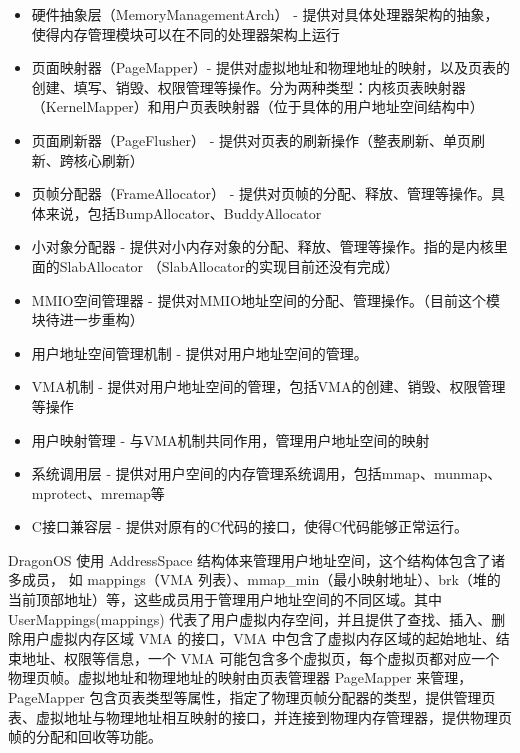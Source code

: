 \begin{itemize}
\item 硬件抽象层（MemoryManagementArch） - 提供对具体处理器架构的抽象，使得内存管理模块可以在不同的处理器架构上运行

\item 页面映射器（PageMapper）- 提供对虚拟地址和物理地址的映射，以及页表的创建、填写、销毁、权限管理等操作。分为两种类型：内核页表映射器（KernelMapper）和用户页表映射器（位于具体的用户地址空间结构中）

\item 页面刷新器（PageFlusher） - 提供对页表的刷新操作（整表刷新、单页刷新、跨核心刷新）

\item 页帧分配器（FrameAllocator） - 提供对页帧的分配、释放、管理等操作。具体来说，包括BumpAllocator、BuddyAllocator

\item 小对象分配器 - 提供对小内存对象的分配、释放、管理等操作。指的是内核里面的SlabAllocator （SlabAllocator的实现目前还没有完成）

\item MMIO空间管理器 - 提供对MMIO地址空间的分配、管理操作。（目前这个模块待进一步重构）

\item 用户地址空间管理机制 - 提供对用户地址空间的管理。

\item VMA机制 - 提供对用户地址空间的管理，包括VMA的创建、销毁、权限管理等操作

\item 用户映射管理 - 与VMA机制共同作用，管理用户地址空间的映射

\item 系统调用层 - 提供对用户空间的内存管理系统调用，包括mmap、munmap、mprotect、mremap等

\item C接口兼容层 - 提供对原有的C代码的接口，使得C代码能够正常运行。
\end{itemize}

DragonOS 使用 AddressSpace 结构体来管理用户地址空间，这个结构体包含了诸多成员，
如 mappings（VMA 列表）、mmap\_min（最小映射地址）、brk（堆的当前顶部地址）等，这些成员用于管理用户地址空间的不同区域。其中 UserMappings(mappings) 代表了用户虚拟内存空间，并且提供了查找、插入、删除用户虚拟内存区域 VMA 的接口，VMA 中包含了虚拟内存区域的起始地址、结束地址、权限等信息，一个 VMA 可能包含多个虚拟页，每个虚拟页都对应一个物理页帧。虚拟地址和物理地址的映射由页表管理器 PageMapper 来管理，PageMapper 包含页表类型等属性，指定了物理页帧分配器的类型，提供管理页表、虚拟地址与物理地址相互映射的接口，并连接到物理内存管理器，提供物理页帧的分配和回收等功能。

